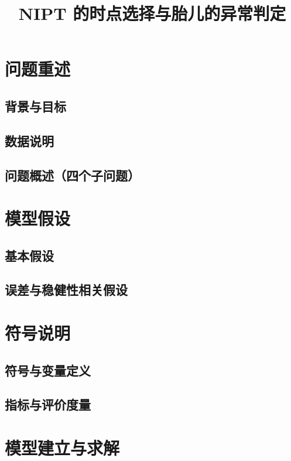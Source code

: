 \documentclass[withoutpreface]{cumcmthesis}
\title{NIPT 的时点选择与胎儿的异常判定}
\begin{document}
\maketitle

\begin{abstract}
\end{abstract}

\section{问题重述}
\subsection{背景与目标}
\subsection{数据说明}
\subsection{问题概述（四个子问题）}

\section{模型假设}
\subsection{基本假设}
\subsection{误差与稳健性相关假设}

\section{符号说明}
\subsection{符号与变量定义}
\subsection{指标与评价度量}

\section{模型建立与求解}
\end{document}
